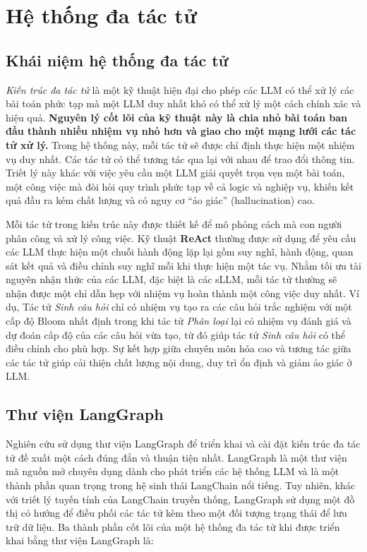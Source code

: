\section{Hệ thống đa tác tử}

\subsection{Khái niệm hệ thống đa tác tử}

\textit{Kiến trúc đa tác tử} là một kỹ thuật hiện đại cho phép các LLM có thể xử lý các bài toán phức tạp mà một LLM duy nhất khó có thể xử lý một cách chính xác và hiệu quả. \textbf{Nguyên lý cốt lõi của kỹ thuật này là chia nhỏ bài toán ban đầu thành nhiều nhiệm vụ nhỏ hơn và giao cho một mạng lưới các tác tử xử lý.} Trong hệ thống này, mỗi tác tử sẽ được chỉ định thực hiện một nhiệm vụ duy nhất. Các tác tử có thể tương tác qua lại với nhau để trao đổi thông tin. Triết lý này khác với việc yêu cầu một LLM giải quyết trọn vẹn một bài toán, một công việc mà đòi hỏi quy trình phức tạp về cả logic và nghiệp vụ, khiến kết quả đầu ra kém chất lượng và có nguy cơ ``ảo giác'' (hallucination) cao.

Mỗi tác tử trong kiến trúc này được thiết kế để mô phỏng cách mà con người phân công và xử lý công việc. Kỹ thuật \textbf{ReAct} \cite{yao2022react} thường được sử dụng để yêu cầu các LLM thực hiện một chuỗi hành động lặp lại gồm suy nghĩ, hành động, quan sát kết quả và điều chỉnh suy nghĩ mỗi khi thực hiện một tác vụ. Nhằm tối ưu tài nguyên nhận thức của các LLM, đặc biệt là các sLLM, mỗi tác tử thường sẽ nhận được một chỉ dẫn hẹp với nhiệm vụ hoàn thành một công việc duy nhất. Ví dụ, Tác tử \textit{Sinh câu hỏi} chỉ có nhiệm vụ tạo ra các câu hỏi trắc nghiệm với một cấp độ Bloom nhất định trong khi tác tử \textit{Phân loại} lại có nhiệm vụ đánh giá và dự đoán cấp độ của các câu hỏi vừa tạo, từ đó giúp tác tử \textit{Sinh câu hỏi} có thể điều chỉnh cho phù hợp. Sự kết hợp giữa chuyên môn hóa cao và tương tác giữa các tác tử giúp cải thiện chất lượng nội dung, duy trì ổn định và giảm ảo giác ở LLM.

\subsection{Thư viện LangGraph}

Nghiên cứu sử dụng thư viện LangGraph \cite{langgraph2024} để triển khai và cài đặt kiến trúc đa tác tử đề xuất một cách đúng đắn và thuận tiện nhất. LangGraph là một thư viện mã nguồn mở chuyên dụng dành cho phát triển các hệ thống LLM và là một thành phần quan trọng trong hệ sinh thái LangChain \cite{langchain2023} nổi tiếng. Tuy nhiên, khác với triết lý tuyến tính của LangChain truyền thống, LangGraph sử dụng một đồ thị có hướng để điều phối các tác tử kèm theo một đối tượng trạng thái để lưu trữ dữ liệu. Ba thành phần cốt lõi của một hệ thống đa tác tử khi được triển khai bằng thư viện LangGraph là:


